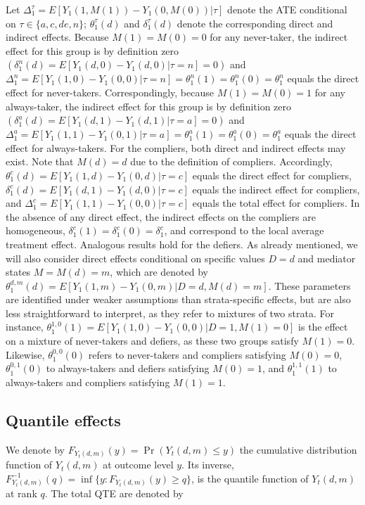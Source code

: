 \documentclass[a4paper,12pt]{article}
\begin{document}
 \doublespacing \pagestyle{plain}
Let $\Delta_1^{\tau} = E[Y_1(1,M(1))-Y_1(0,M(0))|\tau]$ denote the ATE conditional on $\tau \in \{a,c,de,n\}$; $\theta_1^{\tau}(d)$ and $\delta_1^{\tau}(d)$ denote the corresponding direct and indirect effects. Because $M(1)=M(0)=0$ for any never-taker, the indirect effect for this group is by definition zero $(\delta_1^{n}(d)=E[Y_1(d,0) -Y_1(d,0)|\tau=n]=0)$ and $\Delta_1^{n} = E[Y_1(1,0)-Y_1(0,0)|\tau=n]=\theta_1^{n}(1)=\theta_1^{n}(0)=\theta_1^{n}$ equals the direct effect for never-takers. Correspondingly, because $M(1)=M(0)=1$ for any always-taker, the indirect effect for this group is by definition zero $(\delta_1^{a}(d)=E[Y_1(d,1) -Y_1(d,1)|\tau=a]=0)$ and $\Delta_1^{a} = E[Y_1(1,1)-Y_1(0,1)|\tau=a]=\theta_1^{a}(1)=\theta_1^{a}(0)=\theta_1^{a}$ equals the direct effect for always-takers. For the compliers, both direct and indirect effects may exist. Note that $M(d)=d$ due to the definition of compliers. Accordingly, $\theta_1^{c}(d) = E[Y_1(1,d)-Y_1(0,d)|\tau=c]$ equals the direct effect for compliers, $\delta_1^{c}(d)= E[Y_1(d,1) -Y_1(d,0)|\tau=c]$ equals the indirect effect for compliers, and $\Delta_1^{c}= E[Y_1(1,1) -Y_1(0,0)|\tau=c]$ equals the total effect for compliers. In the absence of any direct effect, the indirect effects on the compliers are homogeneous, $\delta_1^{c}(1)=\delta_1^{c}(0)=\delta_1^{c}$, and correspond to the local average treatment effect. Analogous results hold for the defiers.
As already mentioned, we will also consider direct effects conditional on specific values $D=d$ and mediator states $M=M(d)=m$, which are denoted by $\theta_1^{d,m}(d)=E[Y_1(1,m)-Y_1(0,m)|D=d,M(d)=m]$. These parameters are identified under weaker assumptions than strata-specific effects, but are also less straightforward to interpret, as they refer to mixtures of two strata. For instance, $\theta_1^{1,0}(1)=E[Y_1(1,0)-Y_1(0,0)|D=1,M(1)=0]$ is the effect on a mixture of  never-takers and defiers, as these two groups satisfy $M(1)=0$. Likewise, $\theta_1^{0,0}(0)$ refers to never-takers and compliers satisfying $M(0)=0$,  $\theta_1^{0,1}(0)$ to always-takers and defiers satisfying $M(0)=1$, and $\theta_1^{1,1}(1)$ to always-takers and compliers satisfying $M(1)=1$.
\subsection{Quantile effects}
We denote by $F_{Y_{t}(d,m)}(y) = \Pr(Y_t(d,m) \leq y)$ the cumulative distribution function of $Y_t(d,m)$ at outcome level $y$. Its inverse, $F_{Y_{t}(d,m)}^{-1}(q) = \inf \{y : F_{Y_t(d,m)}(y) \geq q \}$, is the quantile function of $Y_t(d,m)$ at rank $q$. The total QTE are denoted by 
\end{document}
